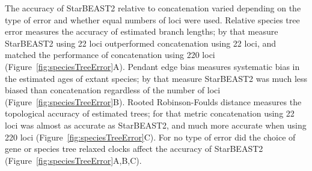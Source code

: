 \documentclass[nogrid]{MBE}%
\begin{document}
The accuracy of StarBEAST2 relative to concatenation varied depending on the
type of error and whether equal numbers of loci were used. Relative species tree
error measures the accuracy of estimated branch lengths; by that measure
StarBEAST2 using 22 loci outperformed concatenation using 22 loci, and matched
the performance of concatenation using 220 loci
(Figure~\ref{fig:speciesTreeError}A). Pendant edge bias measures systematic bias
in the estimated ages of extant species; by that measure StarBEAST2 was much
less biased than concatenation regardless of the number of loci
(Figure~\ref{fig:speciesTreeError}B). Rooted Robinson-Foulds distance measures
the topological accuracy of estimated trees; for that metric concatenation using
22 loci was almost as accurate as StarBEAST2, and much more accurate when using
220 loci (Figure~\ref{fig:speciesTreeError}C). For no type of error did the
choice of gene or species tree relaxed clocks affect the accuracy of StarBEAST2
(Figure~\ref{fig:speciesTreeError}A,B,C).
\end{document}
